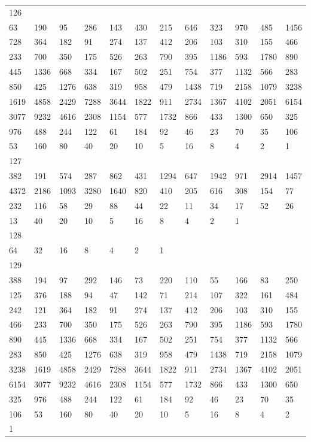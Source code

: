 \begin{longtable}{llllllllllll}
126&&&&&&&&&&&\\
63& 190& 95& 286& 143& 430& 215& 646& 323& 970& 485& 1456\\
728& 364& 182& 91& 274& 137& 412& 206& 103& 310& 155& 466\\
233& 700& 350& 175& 526& 263& 790& 395& 1186& 593& 1780& 890\\
445& 1336& 668& 334& 167& 502& 251& 754& 377& 1132& 566& 283\\
850& 425& 1276& 638& 319& 958& 479& 1438& 719& 2158& 1079& 3238\\
1619& 4858& 2429& 7288& 3644& 1822& 911& 2734& 1367& 4102& 2051& 6154\\
3077& 9232& 4616& 2308& 1154& 577& 1732& 866& 433& 1300& 650& 325\\
976& 488& 244& 122& 61& 184& 92& 46& 23& 70& 35& 106\\
53& 160& 80& 40& 20& 10& 5& 16& 8& 4& 2& 1\\

127&&&&&&&&&&&\\
382& 191& 574& 287& 862& 431& 1294& 647& 1942& 971& 2914& 1457\\
4372& 2186& 1093& 3280& 1640& 820& 410& 205& 616& 308& 154& 77\\
232& 116& 58& 29& 88& 44& 22& 11& 34& 17& 52& 26\\
13& 40& 20& 10& 5& 16& 8& 4& 2& 1& \\

128&&&&&&&&&&&\\
64& 32& 16& 8& 4& 2& 1& \\

129&&&&&&&&&&&\\
388& 194& 97& 292& 146& 73& 220& 110& 55& 166& 83& 250\\
125& 376& 188& 94& 47& 142& 71& 214& 107& 322& 161& 484\\
242& 121& 364& 182& 91& 274& 137& 412& 206& 103& 310& 155\\
466& 233& 700& 350& 175& 526& 263& 790& 395& 1186& 593& 1780\\
890& 445& 1336& 668& 334& 167& 502& 251& 754& 377& 1132& 566\\
283& 850& 425& 1276& 638& 319& 958& 479& 1438& 719& 2158& 1079\\
3238& 1619& 4858& 2429& 7288& 3644& 1822& 911& 2734& 1367& 4102& 2051\\
6154& 3077& 9232& 4616& 2308& 1154& 577& 1732& 866& 433& 1300& 650\\
325& 976& 488& 244& 122& 61& 184& 92& 46& 23& 70& 35\\
106& 53& 160& 80& 40& 20& 10& 5& 16& 8& 4& 2\\
1& \\


\end{longtable}
